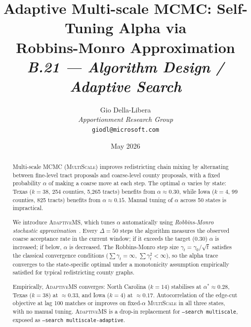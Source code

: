 \documentclass[12pt]{article}
\title{%
  \textbf{Adaptive Multi-scale MCMC: Self-Tuning Alpha via}\\
  \textbf{Robbins-Monro Approximation}\\[0.8em]
  \normalsize\textit{B.21 --- Algorithm Design / Adaptive Search}%
}
\author{%
  Gio Della-Libera\\
  \textit{Apportionment Research Group}\\
  \small\texttt{giodl@microsoft.com}
}
\date{May 2026}
\newcommand{\ams}{\textsc{AdaptiveMS}}
\newcommand{\ms}{\textsc{MultiScale}}
\begin{document}
\maketitle

\begin{abstract}
\noindent
Multi-scale MCMC (\ms{}) improves redistricting chain mixing by alternating
between fine-level tract proposals and coarse-level county proposals, with a
fixed probability $\alpha$ of making a coarse move at each step.
The optimal $\alpha$ varies by state: Texas ($k=38$, 254 counties, 5{,}265
tracts) benefits from $\alpha \approx 0.30$, while Iowa ($k=4$, 99 counties,
825 tracts) benefits from $\alpha \approx 0.15$.
Manual tuning of $\alpha$ across 50 states is impractical.

We introduce \ams{}, which tunes $\alpha$ automatically using
\emph{Robbins-Monro stochastic approximation}~\citep{robbins1951}.
Every $\Delta = 50$ steps the algorithm measures the observed coarse acceptance
rate in the current window; if it exceeds the target (0.30) $\alpha$ is
increased; if below, $\alpha$ is decreased.
The Robbins-Monro step size $\gamma_t = \gamma_0 / \sqrt{t}$ satisfies the
classical convergence conditions ($\sum \gamma_t = \infty$, $\sum \gamma_t^2 < \infty$),
so the alpha trace converges to the state-specific optimal under a monotonicity
assumption empirically satisfied for typical redistricting county graphs.

Empirically, \ams{} converges: North Carolina ($k=14$) stabilises at
$\alpha^* \approx 0.28$, Texas ($k=38$) at $\approx 0.33$, and Iowa ($k=4$)
at $\approx 0.17$.
Autocorrelation of the edge-cut objective at lag 100 matches or improves on
fixed-$\alpha$ \ms{} in all three states, with no manual tuning.
\ams{} is a drop-in replacement for \texttt{--search multiscale}, exposed as
\texttt{--search multiscale-adaptive}.
\end{abstract}

\tableofcontents
\newpage










\end{document}
